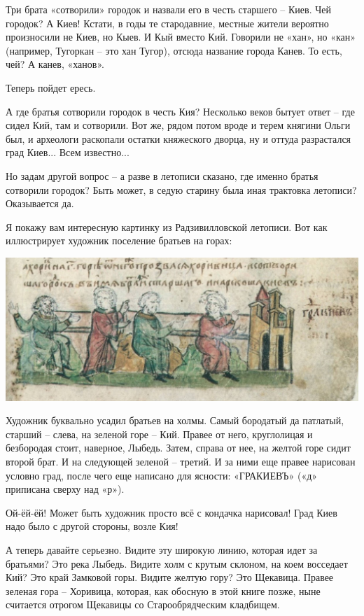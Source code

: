Три брата «сотворили» городок и назвали его в честь старшего – Киев. Чей городок? А Киев! Кстати, в годы те стародавние, местные жители вероятно произносили не Киев, но Кыев. И Кый вместо Кий. Говорили не «хан», но «кан» (например, Тугоркан – это хан Тугор), отсюда название города Канев. То есть, чей? А канев, «ханов».

Теперь пойдет ересь.

А где братья сотворили городок в честь Кия? Несколько веков бытует ответ – где сидел Кий, там и сотворили. Вот же, рядом потом вроде и терем княгини Ольги был, и археологи раскопали остатки княжеского дворца, ну и оттуда разрастался град Киев... Всем известно...

Но задам другой вопрос – а разве в летописи сказано, где именно братья сотворили городок? Быть может, в седую старину была иная трактовка летописи? Оказывается да.

Я покажу вам интересную картинку из Радзивилловской летописи. Вот как иллюстрирует художник поселение братьев на горах:

\begin{center}
\includegraphics[width=\linewidth]{chast-colebanie-osnov/grad-kiev-urk/radz-tri-brata.jpg}
\end{center} 

Художник буквально усадил братьев на холмы. Самый бородатый да патлатый, старший – слева, на зеленой горе – Кий. Правее от него, круглолицая и безбородая стоит, наверное, Лыбедь. Затем, справа от нее, на желтой горе сидит второй брат. И на следующей зеленой – третий. И за ними еще правее нарисован условно град, после чего еще написано для ясности: «ГРАКИЕВЪ» («д» приписана сверху над «р»).

Ой-ёй-ёй! Может быть художник просто всё с кондачка нарисовал! Град Киев надо было с другой стороны, возле Кия!

А теперь давайте серьезно. Видите эту широкую линию, которая идет за братьями? Это река Лыбедь. Видите холм с крутым склоном, на коем восседает Кий? Это край Замковой горы. Видите желтую гору? Это Щекавица. Правее зеленая гора – Хоривица, которая, как обосную в этой книге позже, ныне считается отрогом Щекавицы со Старообрядческим кладбищем.

